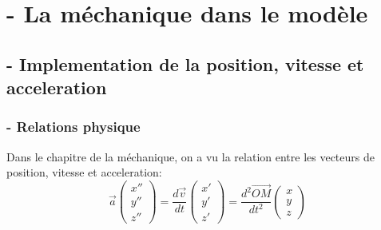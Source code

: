 \documentclass[a4paper, 12pt]{scrartcl}
\begin{document}
\section{- La méchanique dans le modèle}
\subsection{- Implementation de la position, vitesse et acceleration}
\subsubsection{- Relations physique}
Dans le chapitre de la méchanique, on a vu la relation entre les vecteurs
de position, vitesse et acceleration:
\\

\[\overrightarrow{a} \begin{pmatrix} x'' \\ y'' \\ z'' \end{pmatrix}
= \frac{d\overrightarrow{v}}{d t} \begin{pmatrix} x' \\ y' \\ z' \end{pmatrix}
= \frac{d^2 \overrightarrow{OM}}{d t^2}\begin{pmatrix} x \\ y \\ z \end{pmatrix}\]
\\
\\
\end{document}
